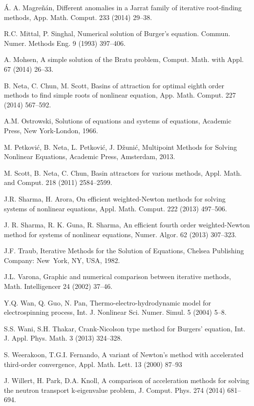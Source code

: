 \begin{thebibliography}{199}
 \'A. A. Magre\~{n}\'an, Different anomalies in a Jarrat family of iterative root-finding methods, App. Math. Comput. 233 (2014) 29--38.

 R.C. Mittal,  P. Singhal, Numerical solution of Burger's equation. {Commun. Numer. Methods Eng.} 9 ({1993}) 397--406.

 A. Mohsen, A simple solution of the Bratu problem, Comput. Math. with Appl. 67 (2014) 26--33.

 B. Neta, C. Chun, M. Scott, Basins of attraction for optimal eighth order methods to find simple roots of nonlinear equation, App. Math. Comput. 227 (2014) 567--592.

 A.M. Ostrowski, Solutions of equations and systems of equations, Academic Press, New York-London, 1966.

 M. Petkovi\'{c}, B. Neta, L. Petkovi\'{c}, J. D\v zuni\'{c}, Multipoint Methods for Solving Nonlinear Equations, Academic Press, Amsterdam, 2013.

 M. Scott, B. Neta, C. Chun,
Basin attractors for various methods,
Appl. Math. and Comput. 218 (2011)
2584--2599.

 J.R. Sharma, H. Arora, On efficient weighted-Newton methods for solving systems of nonlinear equations, Appl. Math. Comput. 222 (2013) 497--506.

 J. R. Sharma, R. K. Guna, R. Sharma, An efficient fourth order weighted-Newton method for systems of nonlinear equations, Numer. Algor. 62 (2013) 307--323.

  J.F. Traub, {Iterative Methods for the Solution of Equations}, Chelsea Publishing Company: New~York, NY, USA, 1982.

 J.L. Varona, Graphic and numerical comparison between iterative methods, Math. Intelligencer 24 (2002) 37--46.

 Y.Q. Wan, Q. Guo, N. Pan, Thermo-electro-hydrodynamic model for electrospinning process, Int. J. Nonlinear Sci. Numer. Simul. 5 (2004) 5--8.

   S.S. Wani, S.H. Thakar, Crank-Nicolson type method for Burgers' equation,    {Int. J. Appl. Phys. Math.} 3 ({2013}) 324--328.

 S. Weerakoon, T.G.I. Fernando, A variant of Newton’s method with accelerated third-order convergence, Appl. Math. Lett. 13 (2000) 87--93

   J. Willert, H. Park, D.A. Knoll, A comparison of acceleration methods for solving the neutron transport k-eigenvalue problem, {J. Comput. Phys.} 274 ({2014}) 681--694.
\end{thebibliography}